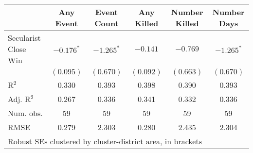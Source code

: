 
\begin{tabular}{l c c c c c }
\hline
 & Any Event & Event Count & Any Killed & Number Killed & Number Days \\
\hline
Secularist Close Win & $-0.176^{*}$ & $-1.265^{*}$ & $-0.141$  & $-0.769$  & $-1.265^{*}$ \\
                     & $(0.095)$    & $(0.670)$    & $(0.092)$ & $(0.663)$ & $(0.670)$    \\
\hline
R$^2$                & 0.330        & 0.393        & 0.398     & 0.390     & 0.393        \\
Adj. R$^2$           & 0.267        & 0.336        & 0.341     & 0.332     & 0.336        \\
Num. obs.            & 59           & 59           & 59        & 59        & 59           \\
RMSE                 & 0.279        & 2.303        & 0.280     & 2.435     & 2.304        \\
\hline
\multicolumn{6}{l}{\scriptsize{Robust SEs clustered by cluster-district area, in brackets}}
\end{tabular}
